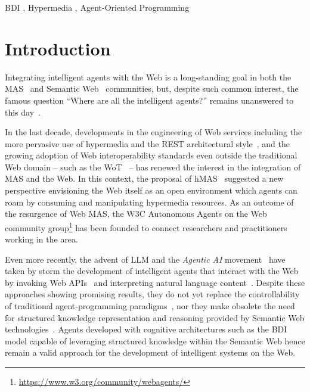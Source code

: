 \documentclass[
]{ceurart}
\begin{document}
\begin{keywords}
  BDI  \sep 
  Hypermedia \sep 
  Agent-Oriented Programming
\end{keywords}

\maketitle

\section{Introduction}

Integrating intelligent agents with the Web is a long-standing goal
in both the \ac{MAS}~\cite{DBLP:conf/edoc/ShafiqDF06}
and Semantic Web~\cite{lassila2001semantic} communities, but,
despite such common interest, 
the famous question ``Where are all the intelligent agents?'' remains unanswered to this day~\cite{hendlerb2007expert}.

In the last decade, developments in the engineering of Web services including
the more pervasive use of hypermedia and the \ac{REST} architectural style~\missingref[fielding]{},
and the growing adoption of Web interoperability standards even outside the traditional Web domain
-- such as the \ac{WoT}~\missingref[wotarch]{} --
has renewed the interest in the integration of \ac{MAS} and the Web.
%
In this context, 
the proposal of \ac{hMAS}~\missingref[ciortea]{} suggested a new perspective
envisioning the Web itself as an open environment
which agents can roam by consuming and manipulating hypermedia resources.
%
As an outcome of the resurgence of Web \ac{MAS},
the \ac{W3C} Autonomous Agents on the Web community group\footnote{\url{https://www.w3.org/community/webagents/}}
has been founded to connect researchers and practitioners working in the area. 

Even more recently, the advent of \ac{LLM} and the \emph{Agentic AI} movement~\cite{acharya2025access} 
have taken by storm the development of intelligent agents that interact with the Web by invoking Web APIs~\missingref{} and interpreting natural language content~\missingref{}.
%
Despite these approaches showing promising results,
they do not yet replace the controllability of traditional agent-programming paradigms~\missingref{},
nor they make obsolete the need for structured knowledge representation and reasoning provided by Semantic Web technologies~\cite{pan2024tkde}.
%
Agents developed with cognitive architectures such as the \ac{BDI} model
capable of leveraging structured knowledge within the Semantic Web 
hence remain a valid approach for the development of intelligent systems on the Web.
\end{document}
